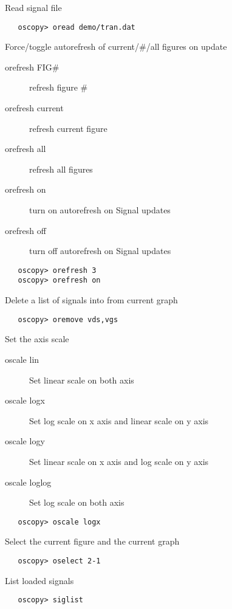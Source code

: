\documentclass[a4paper,11pt]{article}
\begin{document}
   Read signal file
\begin{verbatim}
   oscopy> oread demo/tran.dat
\end{verbatim}

   Force/toggle autorefresh of current/\#/all figures on update
   \begin{description}
   \item[orefresh FIG\#] refresh figure \#
   \item[orefresh current] refresh current figure
   \item[orefresh all]  refresh all figures
   \item[orefresh on] turn on autorefresh on Signal updates
   \item[orefresh off] turn off autorefresh on Signal updates
   \end{description}

\begin{verbatim}
   oscopy> orefresh 3
   oscopy> orefresh on
\end{verbatim}

   Delete a list of signals into from current graph
\begin{verbatim}
   oscopy> oremove vds,vgs
\end{verbatim}

   Set the axis scale
   \begin{description}
   \item[oscale lin] Set linear scale on both axis
   \item[oscale logx] Set log scale on x axis and linear scale on y axis
   \item[oscale logy] Set linear scale on x axis and log scale on y axis
   \item[oscale loglog] Set log scale on both axis
   \end{description}

\begin{verbatim}
   oscopy> oscale logx
\end{verbatim}

   Select the current figure and the current graph
\begin{verbatim}
   oscopy> oselect 2-1
\end{verbatim}

   List loaded signals
\begin{verbatim}
   oscopy> siglist
\end{verbatim}
\end{document}
